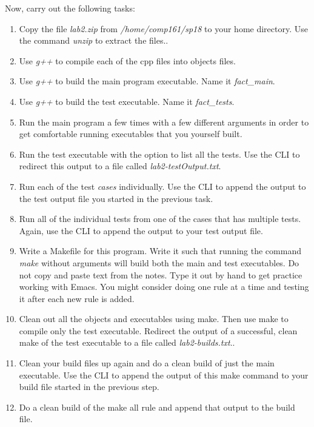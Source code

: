 \documentclass[nobib]{tufte-handout}
\begin{document}
Now, carry out the following tasks:
\begin{enumerate}
\item Copy the file \textit{lab2.zip} from \textit{/home/comp161/sp18} to your home directory. Use the command \textit{unzip} to extract the files..
\item Use \textit{g++} to compile each of the cpp files into objects files.
\item Use \textit{g++} to build the main program executable. Name it \textit{fact\_main}.
\item Use \textit{g++} to build the test executable. Name it \textit{fact\_tests}.
\item Run the main program a few times with a few different arguments in order to get comfortable running executables that you yourself built.
\item Run the test executable with the option to list all the tests. Use the CLI to redirect this output to a file called \textit{lab2-testOutput.txt}.
\item Run each of the test \textit{cases} individually. Use the CLI to append the output to the test output file you started in the previous task.
\item Run all of the individual tests from one of the cases that has multiple tests. Again, use the CLI to append the output to your test output file.
\item Write a Makefile for this program. Write it such that running the command \textit{make} without arguments will build both the main and test executables. Do not copy and paste text from the notes. Type it out by hand to get practice working with Emacs. You might consider doing one rule at a time and testing it after each new rule is added.
\item Clean out all the objects and executables using make. Then use make to compile only the test executable. Redirect the output of a successful, clean make of the test executable to a file called \textit{lab2-builds.txt}..
\item Clean your build files up again and do a clean build of just the main executable. Use the CLI to append the output of this make command to your build file started in the previous step.
\item Do a clean build of the make all rule and append that output to the build file.
\end{enumerate}
\end{document}
